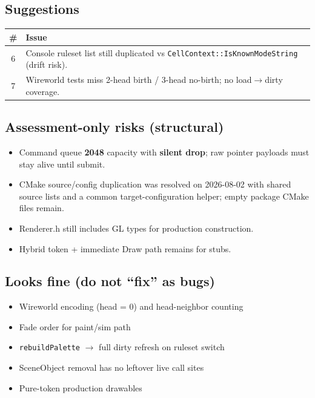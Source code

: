 \documentclass[10pt,a4paper]{article}
\begin{document}
\subsection{Suggestions}
\begin{table}[h!]
\centering
\small
\begin{tabularx}{\textwidth}{c X}
\toprule
\textbf{\#} & \textbf{Issue} \\
\midrule
6 & Console ruleset list still duplicated vs \texttt{CellContext::IsKnownModeString} (drift risk). \\
7 & Wireworld tests miss 2-head birth / 3-head no-birth; no load$\rightarrow$dirty coverage. \\
\bottomrule
\end{tabularx}
\end{table}

\subsection{Assessment-only risks (structural)}
\begin{itemize}
    \item Command queue \textbf{2048} capacity with \textbf{silent drop}; raw pointer payloads must stay alive until submit.
    \item CMake source/config duplication was resolved on 2026-08-02 with shared source lists and a common target-configuration helper; empty package CMake files remain.
    \item Renderer.h still includes GL types for production construction.
    \item Hybrid token + immediate Draw path remains for stubs.
\end{itemize}

\subsection{Looks fine (do not ``fix'' as bugs)}
\begin{itemize}
    \item Wireworld encoding (head = 0) and head-neighbor counting
    \item Fade order for paint/sim path
    \item \texttt{rebuildPalette} $\rightarrow$ full dirty refresh on ruleset switch
    \item SceneObject removal has no leftover live call sites
    \item Pure-token production drawables
\end{itemize}
\end{document}
